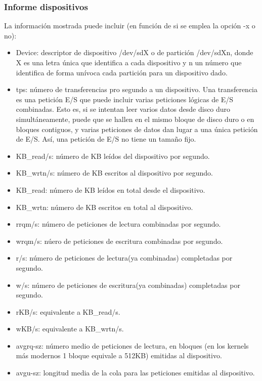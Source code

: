 \documentclass[a4paper,10pt]{article}
\renewcommand{\texttt}[2][black!60]{\textcolor{#1}{\ttfamily #2}}
\begin{document}
\subsubsection{Informe dispositivos}
\label{optdisp}
La información mostrada puede incluir (en función de si se emplea la opción \texttt{-x} o no):
\begin{itemize}
 \item{\texttt{Device}}: descriptor de dispositivo \texttt{/dev/sdX} o de partición \texttt{/dev/sdXn}, donde \texttt{X} es una
 letra única que identifica a cada dispositivo y \texttt{n} un número que identifica de forma unívoca cada partición para un
 dispositivo dado.
 \item{\texttt{tps}}: número de transferencias pro segundo a un dispositivo. Una transferencia es una petición E/S que puede
 incluir varias peticiones lógicas de E/S combinadas. Esto es, si se intentan leer varios datos desde disco duro simultáneamente,
 puede que se hallen en el mismo bloque de disco duro o en bloques contiguos, y varias peticiones de datos dan lugar a una única
 petición de E/S. Así, una petición de E/S no tiene un tamaño fijo.
 \item{\texttt{KB\_read/s}}: número de KB leídos del dispositivo por segundo.
 \item{\texttt{KB\_wrtn/s}}: número de KB escritos al dispositivo por segundo.
 \item{\texttt{KB\_read}}: número de KB leídos en total desde el dispositivo.
 \item{\texttt{KB\_wrtn}}: número de KB escritos en total al dispositivo.
 \item{\texttt{rrqm/s}}: número de peticiones de lectura combinadas por segundo.
 \item{\texttt{wrqm/s}}: núero de peticiones de escritura combinadas por segundo.
 \item{\texttt{r/s}}: número de peticiones de lectura(ya combinadas) completadas por segundo.
 \item{\texttt{w/s}}: número de peticiones de escritura(ya combinadas) completadas por segundo.
 \item{\texttt{rKB/s}}: equivalente a \texttt{KB\_read/s}.
 \item{\texttt{wKB/s}}: equivalente a \texttt{KB\_wrtn/s}.
 \item{\texttt{avgrq-sz}}: número medio de peticiones de lectura, en bloques (en los kernels más modernos 1 bloque equivale a 512KB) emitidas
 al dispositivo.
 \item{\texttt{avgu-sz}}: longitud media de la cola para las peticiones emitidas al dispositivo.

\end{itemize}
\end{document}

